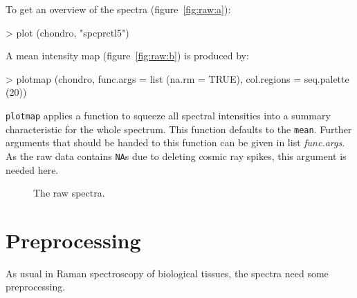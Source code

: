 \documentclass[english, a4paper, 10pt, headings=small, DIV11]{scrartcl}
\renewenvironment{Schunk}{\vspace{0pt}\begin{small}}{\end{small}\vspace{0pt}}
\newcommand{\Rcode}[2][]{\texorpdfstring{\nohyphens{#1\texttt{#2}}}{#2}}
\newcommand{\Rfunction}[2][]{\texorpdfstring{\nohyphens{#1\texttt{#2}}}{#2}}
\newcommand{\Rfunarg}[1]{\texorpdfstring{\nohyphens{\textit{#1}}}{#1}}
\begin{document}
To get an overview of the spectra (figure~\ref{fig:raw:a}):
\begin{Schunk}
\begin{Sinput}
> plot (chondro, "spcprctl5")
\end{Sinput}
\end{Schunk}

A mean intensity map (figure~\ref{fig:raw:b}) is produced by:
\begin{Schunk}
\begin{Sinput}
> plotmap (chondro, func.args = list (na.rm = TRUE), col.regions = seq.palette (20))
\end{Sinput}
\end{Schunk}
\Rfunction{plotmap} applies a function to squeeze all spectral intensities into a summary characteristic for the whole spectrum. This function defaults to the \Rfunction{mean}. Further arguments that should be handed to this function can be given in list \Rfunarg{func.args}. As the raw data contains \Rcode{NA}s due to deleting cosmic ray spikes, this argument is needed here.
\begin{figure}[tbh]
\caption{\label{fig:raw} The raw spectra.}
\end{figure}

\section{Preprocessing}
As usual in Raman spectroscopy of biological tissues, the spectra need some preprocessing.
\end{document}

